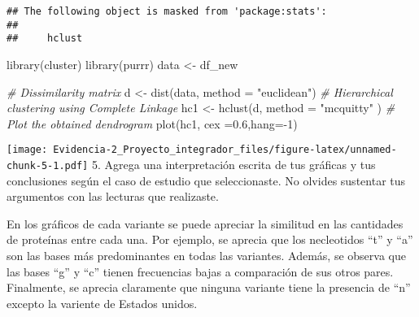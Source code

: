 \documentclass[
]{article}
\newenvironment{Shaded}{\begin{snugshade}}{\end{snugshade}}
\newcommand{\AttributeTok}[1]{\textcolor[rgb]{0.77,0.63,0.00}{#1}}
\newcommand{\CommentTok}[1]{\textcolor[rgb]{0.56,0.35,0.01}{\textit{#1}}}
\newcommand{\DecValTok}[1]{\textcolor[rgb]{0.00,0.00,0.81}{#1}}
\newcommand{\FloatTok}[1]{\textcolor[rgb]{0.00,0.00,0.81}{#1}}
\newcommand{\FunctionTok}[1]{\textcolor[rgb]{0.00,0.00,0.00}{#1}}
\newcommand{\NormalTok}[1]{#1}
\newcommand{\OtherTok}[1]{\textcolor[rgb]{0.56,0.35,0.01}{#1}}
\newcommand{\SpecialCharTok}[1]{\textcolor[rgb]{0.00,0.00,0.00}{#1}}
\newcommand{\StringTok}[1]{\textcolor[rgb]{0.31,0.60,0.02}{#1}}
\begin{document}
\begin{verbatim}
## The following object is masked from 'package:stats':
## 
##     hclust
\end{verbatim}

\begin{Shaded}
\begin{Highlighting}[]
\FunctionTok{library}\NormalTok{(cluster)}
\FunctionTok{library}\NormalTok{(purrr)}
\NormalTok{data }\OtherTok{\textless{}{-}}\NormalTok{ df\_new}

 
\CommentTok{\# Dissimilarity matrix}
\NormalTok{d }\OtherTok{\textless{}{-}} \FunctionTok{dist}\NormalTok{(data, }\AttributeTok{method =} \StringTok{"euclidean"}\NormalTok{)}
\CommentTok{\# Hierarchical clustering using Complete Linkage}
\NormalTok{hc1 }\OtherTok{\textless{}{-}} \FunctionTok{hclust}\NormalTok{(d, }\AttributeTok{method =} \StringTok{"mcquitty"}\NormalTok{ )}
\CommentTok{\# Plot the obtained dendrogram}
\FunctionTok{plot}\NormalTok{(hc1, }\AttributeTok{cex =}\FloatTok{0.6}\NormalTok{,}\AttributeTok{hang=}\SpecialCharTok{{-}}\DecValTok{1}\NormalTok{)}
\end{Highlighting}
\end{Shaded}

\texttt{[image: Evidencia-2\_Proyecto\_integrador\_files/figure-latex/unnamed-chunk-5-1.pdf]}
5. Agrega una interpretación escrita de tus gráficas y tus conclusiones
según el caso de estudio que seleccionaste. No olvides sustentar tus
argumentos con las lecturas que realizaste.

En los gráficos de cada variante se puede apreciar la similitud en las
cantidades de proteínas entre cada una. Por ejemplo, se aprecia que los
necleotidos ``t'' y ``a'' son las bases más predominantes en todas las
variantes. Además, se observa que las bases ``g'' y ``c'' tienen
frecuencias bajas a comparación de sus otros pares. Finalmente, se
aprecia claramente que ninguna variante tiene la presencia de ``n''
excepto la variente de Estados unidos.
\end{document}
